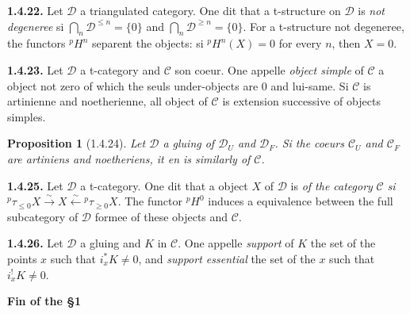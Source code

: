 \documentclass[12pt,a4paper]{article}
\theoremstyle{plain}
\newtheorem{proposition}[theorem]{Proposition}
\theoremstyle{definition}
\theoremstyle{remark}
\newcommand{\cC}{\mathcal{C}}
\newcommand{\cD}{\mathcal{D}}
\begin{document}
\smallskip

\noindent
\textbf{1.4.22.} Let $\cD$ a triangulated category. One dit that a t-structure on $\cD$ is \emph{not degeneree} si $\bigcap_{n} \cD^{\leq n} = \{0\}$ and $\bigcap_{n} \cD^{\geq n} = \{0\}$. For a t-structure not degeneree, the functors ${}^{p}H^{n}$ separent the objects: si ${}^{p}H^{n}(X) = 0$ for every $n$, then $X = 0$.

\smallskip

\noindent
\textbf{1.4.23.} Let $\cD$ a t-category and $\cC$ son coeur. One appelle \emph{object simple} of $\cC$ a object not zero of which the seuls under-objects are $0$ and lui-same. Si $\cC$ is artinienne and noetherienne, all object of $\cC$ is extension successive of objects simples.

\smallskip

\begin{proposition}[1.4.24]
Let $\cD$ a gluing of $\cD_{U}$ and $\cD_{F}$. Si the coeurs $\cC_{U}$ and $\cC_{F}$ are artiniens and noetheriens, it en is similarly of $\cC$.
\end{proposition}

\smallskip

\noindent
\textbf{1.4.25.} Let $\cD$ a t-category. One dit that a object $X$ of $\cD$ is \emph{of the category} $\cC$ \emph{si} ${}^{p}\tau_{\leq 0}X \xrightarrow{\sim} X \xleftarrow{\sim} {}^{p}\tau_{\geq 0}X$. The functor ${}^{p}H^{0}$ induces a equivalence between the full subcategory of $\cD$ formee of these objects and $\cC$.

\smallskip

\noindent
\textbf{1.4.26.} Let $\cD$ a gluing and $K$ in $\cC$. One appelle \emph{support} of $K$ the set of the points $x$ such that $i_{x}^{*}K \neq 0$, and \emph{support essential} the set of the $x$ such that $i_{x}^{!}K \neq 0$.

\medskip

\noindent
\textbf{Fin of the \S 1}
\end{document}
